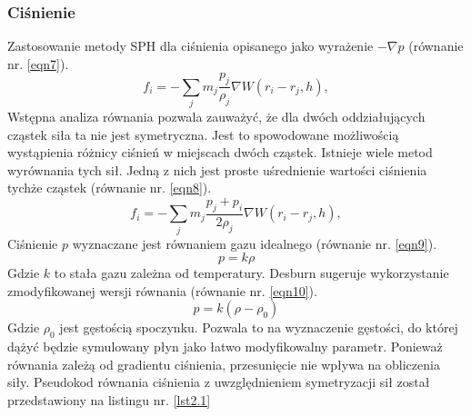 \documentclass{article}
\begin{document}
\subsubsection{Ciśnienie}
Zastosowanie metody SPH dla ciśnienia opisanego jako wyrażenie $- \nabla p$ (równanie nr. \ref{eqn7}).
\begin{equation}\label{eqn7}
f_i = -\sum_j m_j \frac{p_j}{\rho_j}\nabla W(r_i - r_j, h),
\end{equation}
Wstępna analiza równania pozwala zauważyć, że dla dwóch oddziałujących cząstek siła ta nie jest symetryczna. 
Jest to spowodowane możliwością wystąpienia różnicy ciśnień w miejscach dwóch cząstek. Istnieje wiele metod wyrównania tych sił. 
Jedną z nich jest proste uśrednienie wartości ciśnienia tychże cząstek (równanie nr. \ref{eqn8}).\newline
\begin{equation}\label{eqn8}
f_i = -\sum_j m_j \frac{p_j + p_i}{2\rho_j}\nabla W(r_i - r_j, h),
\end{equation}
Ciśnienie $p$ wyznaczane jest równaniem gazu idealnego (równanie nr. \ref{eqn9}).\newline
\begin{equation}\label{eqn9}
p=k\rho
\end{equation}
\indent
Gdzie $k$ to stała gazu zależna od temperatury.\newline\newline
Desburn\cite{desburn} sugeruje wykorzystanie zmodyfikowanej wersji równania (równanie nr. \ref{eqn10}).\newline
\begin{equation}\label{eqn10}
p=k(\rho - \rho_0)
\end{equation}
\indent
Gdzie $\rho_0$ jest gęstością spoczynku.\newline\newline
Pozwala to na wyznaczenie gęstości, do której dążyć będzie symulowany płyn jako łatwo modyfikowalny parametr.\newline
Ponieważ równania zależą od gradientu ciśnienia, przesunięcie nie wpływa na obliczenia siły.\newline
\noindent
Pseudokod równania ciśnienia z uwzględnieniem symetryzacji sił został przedstawiony na listingu nr. \ref{lst2.1}\newline
\end{document}
